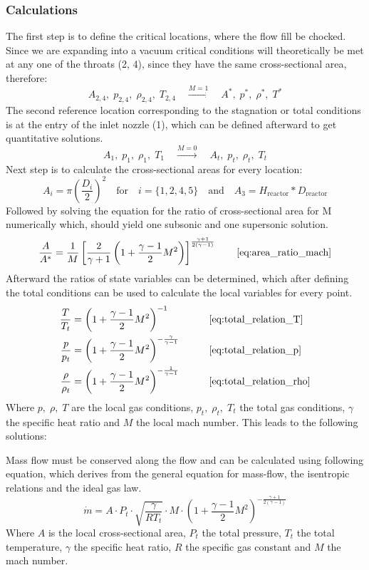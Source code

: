 \subsubsection*{Calculations}
The first step is to define the critical locations, where the flow fill be chocked.
Since we are expanding into a vacuum critical conditions will theoretically be met at any one of the throats (2, 4), since they have the same cross-sectional area, therefore:
$$
	A_{2,4},\;p_{2,4},\;\rho_{2,4},\;T_{2,4}\quad\xrightarrow{M=1}\quad A^*,\;p^*,\;\rho^*,\;T^*
$$
The second reference location corresponding to the stagnation or total conditions is at the entry of the inlet nozzle (1), which can be defined afterward to get quantitative solutions.
$$
	A_1,\;p_1,\;\rho_1,\;T_1\quad\xrightarrow{M=0}\quad A_t,\;p_t,\;\rho_t,\;T_t
$$
Next step is to calculate the cross-sectional areas for every location:
$$
	A_i = \pi \left(\frac{D_i}{2}\right)^2
		\quad \text{for} \quad
	i=\{1,2,4,5\}
		\quad \text{and} \quad
	A_3 = H_\text{reactor}*D_\text{reactor}
$$
Followed by solving the equation for the ratio of cross-sectional area for M numerically which, should yield one subsonic and one supersonic solution.
$$
	\frac{A}{A^*} = \frac{1}{M} \left[ \frac{2}{\gamma + 1} \left( 1 + \frac{\gamma - 1}{2} M^2 \right) \right]^{\frac{\gamma + 1}{2(\gamma - 1)}}
	\qquad \eqref{eq:area_ratio_mach}
$$
Afterward the ratios of state variables can be determined, which after defining the total conditions can be used to calculate the local variables for every point.
\cite{hall_isentropic_nodate}
\begin{alignat*}{2}
    \frac{T}{T_t}   & = \left( 1 + \frac{\gamma - 1}{2} M^2 \right)^{-1}
    & \qquad & \eqref{eq:total_relation_T} \\
    \frac{p}{p_t}   & = \left( 1 + \frac{\gamma - 1}{2} M^2 \right)^{-\frac{\gamma}{\gamma - 1}}
    & \qquad & \eqref{eq:total_relation_p} \\
    \frac{\rho}{\rho_t} & = \left( 1 + \frac{\gamma - 1}{2} M^2 \right)^{-\frac{1}{\gamma - 1}}
    & \qquad & \eqref{eq:total_relation_rho}
\end{alignat*}
Where $p,\; \rho,\; T$ are the local gas conditions, $p_t,\; \rho_t,\; T_t$ the total gas conditions, $\gamma$ the specific heat ratio and $M$ the local mach number.
This leads to the following solutions:

Mass flow must be conserved along the flow and can be calculated using following equation, which derives from the general equation for mass-flow, the isentropic relations and the ideal gas law.
\cite{benson_mass_nodate}
$$
	\dot{m} = A \cdot P_t \cdot \sqrt{\frac{\gamma}{R T_t}} \cdot M \cdot \left(1 + \frac{\gamma - 1}{2} M^2\right)^{-\frac{\gamma + 1}{2(\gamma - 1)}}
$$
Where $A$ is the local cross-sectional area, $P_t$ the total pressure, $T_t$ the total temperature, $\gamma$ the specific heat ratio, $R$ the specific gas constant and $M$ the mach number.
